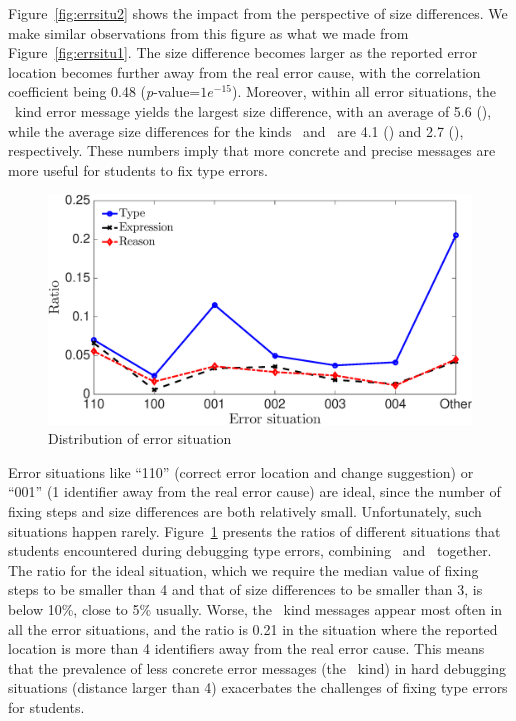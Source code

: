\documentclass[12pt]{report}	%
\begin{document}
Figure~\ref{fig:errsitu2} shows the impact from
the perspective of size differences. We make similar 
observations from this figure as what we made from
Figure~\ref{fig:errsitu1}. 
The size difference
becomes larger as the reported error location becomes
further away from the real error cause, with the
correlation coefficient being 0.48 (\emph{p}-value=$1e^{-15}$).
Moreover, within all error situations, the \typet\ kind
error message yields the largest size difference, with
an average of 5.6 (), while the average size differences
for the kinds \typer\ and \typer\ are 
4.1 () and 2.7 (), respectively.
%
These numbers imply that more concrete and precise messages
are more useful for students to fix type errors.

\begin{figure}
\centering
\includegraphics[width=0.85\columnwidth]{images/error_ratio.eps}
\caption{Distribution of error situation}
\label{fig:er}
\end{figure}

Error situations like ``110'' (correct error location and change suggestion)
or ``001'' (1 identifier away from the real error cause) are ideal,
since the number of fixing steps and size differences 
are both relatively small. 
Unfortunately, such situations happen rarely.
Figure~\ref{fig:er} presents the ratios of different situations that
students encountered during debugging type errors,
combining \benchf\ and \benchs\ together.
The ratio for the ideal situation, which we require
the median value 
of fixing steps to be smaller than 4 and that of size differences
to be smaller than 3, is below 10\%, close
to 5\% usually.
Worse,
the \typet\ kind messages appear most often in
all the error situations,
and the ratio is 0.21 in the situation where
the reported location is more than 4 identifiers away
from the real error cause.
This means that the prevalence of less concrete
error messages (the \typet\ kind) in hard debugging
situations (distance larger than 4) exacerbates
the challenges of fixing type errors for students.
\end{document}
